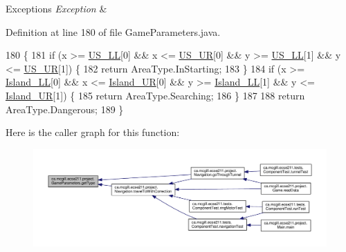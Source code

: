 \begin{DoxyExceptions}{Exceptions}
{\em Exception} & \\
\hline
\end{DoxyExceptions}


Definition at line 180 of file Game\+Parameters.\+java.


\begin{DoxyCode}
180                                                \{
181     \textcolor{keywordflow}{if} (x >= \hyperlink{enumca_1_1mcgill_1_1ecse211_1_1project_1_1_game_parameters_a4b437dfb1ca3a0898631dfd670828202}{US\_LL}[0] && x <= \hyperlink{enumca_1_1mcgill_1_1ecse211_1_1project_1_1_game_parameters_ab53ad7cced40d028fd0bbc3472cd2f8d}{US\_UR}[0] && y >= \hyperlink{enumca_1_1mcgill_1_1ecse211_1_1project_1_1_game_parameters_a4b437dfb1ca3a0898631dfd670828202}{US\_LL}[1] && y <= 
      \hyperlink{enumca_1_1mcgill_1_1ecse211_1_1project_1_1_game_parameters_ab53ad7cced40d028fd0bbc3472cd2f8d}{US\_UR}[1]) \{
182       \textcolor{keywordflow}{return} AreaType.InStarting;
183     \}
184     \textcolor{keywordflow}{if} (x >= \hyperlink{enumca_1_1mcgill_1_1ecse211_1_1project_1_1_game_parameters_a70576bc98218fc0b4a7b2d3b2d56ed2b}{Island\_LL}[0] && x <= \hyperlink{enumca_1_1mcgill_1_1ecse211_1_1project_1_1_game_parameters_ac442a5d4a39d6ffae29a183eca5934d3}{Island\_UR}[0] && y >= 
      \hyperlink{enumca_1_1mcgill_1_1ecse211_1_1project_1_1_game_parameters_a70576bc98218fc0b4a7b2d3b2d56ed2b}{Island\_LL}[1] && y <= \hyperlink{enumca_1_1mcgill_1_1ecse211_1_1project_1_1_game_parameters_ac442a5d4a39d6ffae29a183eca5934d3}{Island\_UR}[1]) \{
185       \textcolor{keywordflow}{return} AreaType.Searching;
186     \}
187 
188     \textcolor{keywordflow}{return} AreaType.Dangerous;
189   \}
\end{DoxyCode}
Here is the caller graph for this function\+:\nopagebreak
\begin{figure}[H]
\begin{center}
\leavevmode
\includegraphics[width=350pt]{enumca_1_1mcgill_1_1ecse211_1_1project_1_1_game_parameters_a4e7713b30588fc0b2af065db0b198b2c_icgraph}
\end{center}
\end{figure}


